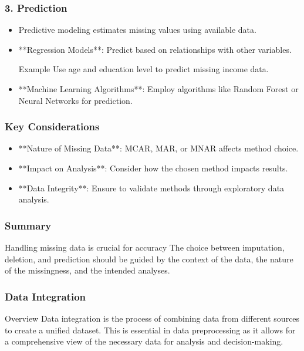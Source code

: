 \documentclass[aspectratio=169]{beamer}
\begin{document}
\begin{frame}[fragile]
    \frametitle{3. Prediction}
    \begin{itemize}
        \item Predictive modeling estimates missing values using available data.
        \item **Regression Models**: Predict based on relationships with other variables.
        \begin{block}{Example}
            Use age and education level to predict missing income data.
        \end{block}

        \item **Machine Learning Algorithms**: Employ algorithms like Random Forest or Neural Networks for prediction.
    \end{itemize}
\end{frame}

\begin{frame}[fragile]
    \frametitle{Key Considerations}
    \begin{itemize}
        \item **Nature of Missing Data**: MCAR, MAR, or MNAR affects method choice.
        \item **Impact on Analysis**: Consider how the chosen method impacts results.
        \item **Data Integrity**: Ensure to validate methods through exploratory data analysis.
    \end{itemize}
\end{frame}

\begin{frame}[fragile]
    \frametitle{Summary}
    \begin{block}{Handling missing data is crucial for accuracy}
        The choice between imputation, deletion, and prediction should be guided by the context of the data, the nature of the missingness, and the intended analyses.
    \end{block}
\end{frame}

\begin{frame}[fragile]
    \frametitle{Data Integration}
    \begin{block}{Overview}
        Data integration is the process of combining data from different sources to create a unified dataset. This is essential in data preprocessing as it allows for a comprehensive view of the necessary data for analysis and decision-making.
    \end{block}
\end{frame}
\end{document}
